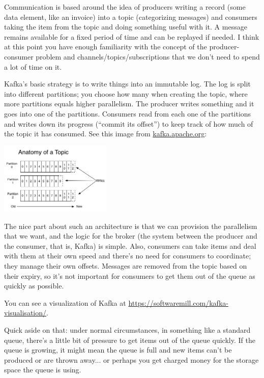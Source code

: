 \documentclass[a4paper]{report}
\begin{document}
Communication is based around the idea of producers writing a record (some data element, like an invoice) into a topic (categorizing messages) and consumers taking the item from the topic and doing something useful with it. A message remains available for a fixed period of time and can be replayed if needed. I think at this point you have enough familiarity with the concept of the producer-consumer problem and channels/topics/subscriptions that we don't need to spend a lot of time on it. 


Kafka's basic strategy is to write things into an immutable log. The log is split into different partitions; you choose how many when creating the topic, where more partitions equals higher parallelism. The producer writes something and it goes into one of the partitions. Consumers read from each one of the partitions and writes down its progress (``commit its offset'') to keep track of how much of the topic it has consumed.  See this image from \url{kafka.apache.org}:

\begin{center}
	\includegraphics[width=0.4\textwidth]{images/kafka-partition.png}
\end{center}

The nice part about such an architecture is that we can provision the parallelism that we want, and the logic for the broker (the system between the producer and the consumer, that is, Kafka) is simple. Also, consumers can take items and deal with them at their own speed and there's no need for consumers to coordinate; they manage their own offsets. Messages are removed from the topic based on their expiry, so it's not important for consumers to get them out of the queue as quickly as possible.

You can see a visualization of Kafka at \href{https://softwaremill.com/kafka-visualisation/}{https://softwaremill.com/kafka-visualisation/}.

Quick aside on that: under normal circumstances, in something like a standard queue, there's a little bit of pressure to get items out of the queue quickly. If the queue is growing, it might mean the queue is full and new items can't be produced or are thrown away... or perhaps you get charged money for the storage space the queue is using. 
\end{document}
